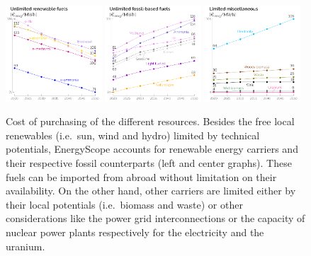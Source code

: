 \documentclass[11pt,twoside,a4paper,english]{article}
\def\ie{i.e.\ }
\begin{document}
\begin{figure}[!htbp]
\centering

\includegraphics[width=0.32\textwidth]{figures/Res_ren.pdf}
\includegraphics[width=0.32\textwidth]{figures/Res_foss.pdf}
\includegraphics[width=0.32\textwidth]{figures/Res_misc.pdf}
\caption{Cost of purchasing of the different resources. Besides the free local renewables (\ie sun, wind and hydro) limited by technical potentials, EnergyScope accounts for renewable energy carriers and their respective fossil counterparts (left and center graphs). These fuels can be imported from abroad without limitation on their availability. On the other hand, other carriers are limited either by their local potentials (\ie biomass and waste) or other considerations like the power grid interconnections or the capacity of nuclear power plants respectively for the electricity and the uranium.}
\label{fig:cs_resources_cost}
\end{figure}
\end{document}
